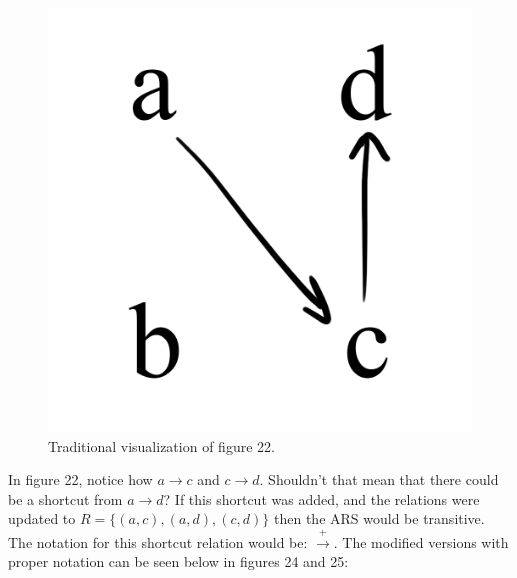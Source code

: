 \documentclass{article}
\begin{document}
\begin{figure}[H]
  \centering
  \includegraphics[scale=0.06]{v4}
  \caption[] {
    Traditional visualization of figure 22.
    \endtabular}
\end{figure}

\medskip\noindent
In figure 22, notice how $a \rightarrow c$ and $c \rightarrow d$. Shouldn’t that mean that there could be a shortcut from $a \rightarrow d$? If this shortcut was added, and the relations were updated to $R = \{(a, c), (a, d), (c, d)\}$ then the ARS would be transitive. The notation for this shortcut relation would be: $\xrightarrow{+}$. The modified versions with proper notation can be seen below in figures 24 and 25:
\end{document}
